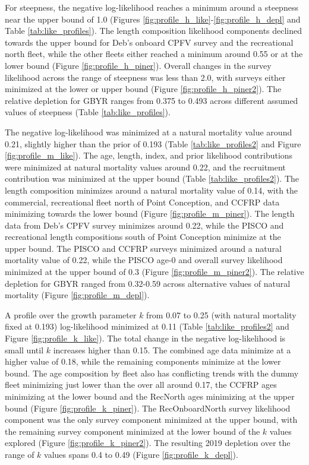 \documentclass[12pt,]{article}
\begin{document}
For steepness, the negative log-likelihood reaches a minimum around a
steepness near the upper bound of 1.0 (Figures
\ref{fig:profile_h_like}-\ref{fig:profile_h_depl} and Table
\ref{tab:like_profiles}). The length composition likelihood components
declined towards the upper bound for Deb's onboard CPFV survey and the
recreational north fleet, while the other fleets either reached a
minimum around 0.55 or at the lower bound (Figure
\ref{fig:profile_h_piner}). Overall changes in the survey likelihood
across the range of steepness was less than 2.0, with surveys either
minimized at the lower or upper bound (Figure
\ref{fig:profile_h_piner2}). The relative depletion for GBYR ranges from
0.375 to 0.493 across different assumed values of steepness (Table
\ref{tab:like_profiles}).

The negative log-likelihood was minimized at a natural mortality value
around 0.21, slightly higher than the prior of 0.193 (Table
\ref{tab:like_profiles2} and Figure \ref{fig:profile_m_like}). The age,
length, index, and prior likelihood contributions were minimized at
natural mortality values around 0.22, and the recruitment contribution
was minimized at the upper bound (Table \ref{tab:like_profiles2}). The
length composition minimizes around a natural mortality value of 0.14,
with the commercial, recreational fleet north of Point Conception, and
CCFRP data minimizing towards the lower bound (Figure
\ref{fig:profile_m_piner}). The length data from Deb's CPFV survey
minimizes around 0.22, while the PISCO and recreational length
compositions south of Point Conception minimize at the upper bound. The
PISCO and CCFRP surveys minimized around a natural mortality value of
0.22, while the PISCO age-0 and overall survey likelihood minimized at
the upper bound of 0.3 (Figure \ref{fig:profile_m_piner2}). The relative
depletion for GBYR ranged from 0.32-0.59 across alternative values of
natural mortality (Figure \ref{fig:profile_m_depl}).

A profile over the growth parameter \(k\) from 0.07 to 0.25 (with
natural mortality fixed at 0.193) log-likelihood minimized at 0.11
(Table \ref{tab:like_profiles2} and Figure \ref{fig:profile_k_like}).
The total change in the negative log-likelihood is small until \(k\)
increases higher than 0.15. The combined age data minimize at a higher
value of 0.18, while the remaining components minimize at the lower
bound. The age composition by fleet also has conflicting trends with the
dummy fleet minimizing just lower than the over all around 0.17, the
CCFRP ages minimizing at the lower bound and the RecNorth ages
minimizing at the upper bound (Figure \ref{fig:profile_k_piner}). The
RecOnboardNorth survey likelihood component was the only survey
component minimized at the upper bound, with the remaining survey
component minimized at the lower bound of the \(k\) values explored
(Figure \ref{fig:profile_k_piner2}). The resulting 2019 depletion over
the range of \(k\) values spans 0.4 to 0.49 (Figure
\ref{fig:profile_k_depl}).
\end{document}
